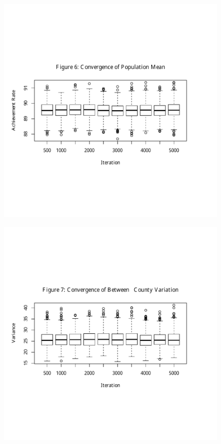 \documentclass[11pt]{article}
\begin{document}
\begin{figure}[H]
\centering
    \includegraphics[trim= 0in 1.5in 0in 1.5in,clip,scale=0.8]{mu}
\end{figure}
\begin{figure}[H]
\centering
    \includegraphics[trim= 0in 1.5in 0in 2in,clip,scale=0.8]{tau}
\end{figure}
\end{document}
